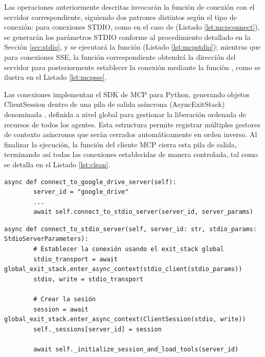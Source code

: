 Las operaciones anteriormente descritas invocarán la función de conexión con el servidor correspondiente, siguiendo dos patrones distintos según el tipo de conexión: para conexiones STDIO, como en el caso de  (Listado \ref{lst:mcpconnect}), se generarán los parámetros STDIO conforme al procedimiento detallado en la Sección \ref{sec:stdio}, y se ejecutará la función  (Listado \ref{lst:mcpstdio}); mientras que para conexiones SSE, la función correspondiente obtendrá la dirección del servidor para posteriormente establecer la conexión mediante la función , como se ilustra en el Listado \ref{lst:mcpsse}.

Las conexiones implementan el SDK de MCP para Python, generando objetos ClientSession dentro de una pila de salida asíncrona (AsyncExitStack) denominada , definida a nivel global para gestionar la liberación ordenada de recursos de todos los agentes. Esta estructura permite registrar múltiples gestores de contexto asíncronos que serán cerrados automáticamente en orden inverso. Al finalizar la ejecución, la función  del cliente MCP cierra esta pila de salida, terminando así todas las conexiones establecidas de manera controlada, tal como se detalla en el Listado \ref{lst:clean}. 

\begin{lstlisting}[caption={\protect\opus{mcp_multi_client.py}: función \protect\opus{connect_to_google_drive_server} en el cliente MCP},label={lst:mcpconnect}]
    async def connect_to_google_drive_server(self):
        server_id = "google_drive"
        ...
        await self.connect_to_stdio_server(server_id, server_params)
\end{lstlisting}

\begin{lstlisting}[caption={\protect\opus{mcp_multi_client.py}: función \protect\opus{connect_to_stdio_server} en el cliente MCP},label={lst:mcpstdio}]
    async def connect_to_stdio_server(self, server_id: str, stdio_params: StdioServerParameters):
        # Establecer la conexión usando el exit_stack global
        stdio_transport = await global_exit_stack.enter_async_context(stdio_client(stdio_params))
        stdio, write = stdio_transport

        # Crear la sesión
        session = await global_exit_stack.enter_async_context(ClientSession(stdio, write))
        self._sessions[server_id] = session

        await self._initialize_session_and_load_tools(server_id)

\end{lstlisting}

